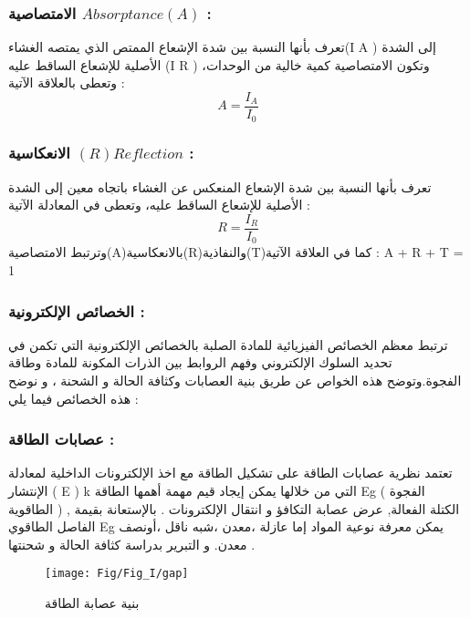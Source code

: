 		\subsubsection*{الامتصاصية $ Absorptance (A) $ : }
		 تعرف بأنها النسبة بين شدة الإشعاع الممتص الذي يمتصه الغشاء(I A ) إلى الشدة الأصلية للإشعاع الساقط عليه (I R ) وتكون الامتصاصية كمية خالية من الوحدات، وتعطى بالعلاقة الآتية : \begin{equation*} 	A = \dfrac{I_{A} }{I_{0}}\end{equation*}
		
				\subsubsection*{الانعكاسية $ (R) Reflection $ :} 
		 تعرف بأنها النسبة بين شدة الإشعاع المنعكس عن الغشاء باتجاه معين إلى الشدة الأصلية للإشعاع الساقط عليه، وتعطى في المعادلة الآتية : \begin{equation*} 	R = \dfrac{I_{R} }{I_{0}}\end{equation*}
		وترتبط الامتصاصية(A)بالانعكاسية(R)والنفاذية(T)كما في العلاقة الآتية : A + R + T = 1
	
	\subsubsection{الخصائص الإلكترونية : }
	
	 ترتبط معظم الخصائص الفيزيائية للمادة الصلبة بالخصائص الإلكترونية التي تكمن في تحديد السلوك الإلكتروني وفهم الروابط بين الذرات المكونة للمادة وطاقة الفجوة.وتوضح هذه الخواص عن طريق بنية العصابات وكثافة الحالة و الشحنة ، و نوضح هذه الخصائص فيما يلي :
	
			\subsubsection*{عصابات الطاقة :}
		 تعتمد نظرية عصابات الطاقة على تشكيل الطاقة مع اخذ الإلكترونات الداخلية لمعادلة الإنتشار ( E ) k التي من خلالها يمكن إيجاد قيم مهمة أهمها الطاقة Eg ( الفجوة الطاقوية ) , الكتلة الفعالة, عرض عصابة التكافؤ و انتقال الإلكترونات . 
		بالإستعانة بقيمة الفاصل الطاقوي Eg يمكن معرفة نوعية المواد إما عازلة ،معدن ،شبه ناقل ،أونصف معدن. و التبرير بدراسة كثافة الحالة و شحنتها .\\
		
		\begin{figure}[th]
			\centering
			\texttt{[image: Fig/Fig\_I/gap]}
			\caption{بنية عصابة الطاقة}
			\label{fig:gap}
		\end{figure}
		\FloatBarrier
		
